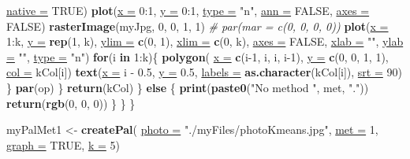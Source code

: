 \documentclass[twoside,symmetric]{book}
\newenvironment{Shaded}{}{}
\newcommand{\CommentTok}[1]{\textit{#1}}
\newcommand{\ControlFlowTok}[1]{\textbf{#1}}
\newcommand{\DataTypeTok}[1]{\underline{#1}}
\newcommand{\DecValTok}[1]{#1}
\newcommand{\FloatTok}[1]{#1}
\newcommand{\KeywordTok}[1]{\textbf{#1}}
\newcommand{\NormalTok}[1]{#1}
\newcommand{\OperatorTok}[1]{#1}
\newcommand{\OtherTok}[1]{#1}
\newcommand{\StringTok}[1]{#1}
\begin{document}
\begin{Shaded}
\begin{Highlighting}[]
                  \DataTypeTok{native =} \OtherTok{TRUE}\NormalTok{)}
                \KeywordTok{plot}\NormalTok{(}\DataTypeTok{x =} \DecValTok{0}\OperatorTok{:}\DecValTok{1}\NormalTok{, }\DataTypeTok{y =} \DecValTok{0}\OperatorTok{:}\DecValTok{1}\NormalTok{, }
                     \DataTypeTok{type =} \StringTok{"n"}\NormalTok{, }
                     \DataTypeTok{ann =} \OtherTok{FALSE}\NormalTok{, }
                     \DataTypeTok{axes =} \OtherTok{FALSE}\NormalTok{)}
                \KeywordTok{rasterImage}\NormalTok{(myJpg, }\DecValTok{0}\NormalTok{, }\DecValTok{0}\NormalTok{, }\DecValTok{1}\NormalTok{, }\DecValTok{1}\NormalTok{)}
                \CommentTok{# par(mar = c(0, 0, 0, 0))}
                \KeywordTok{plot}\NormalTok{(}\DataTypeTok{x =} \DecValTok{1}\OperatorTok{:}\NormalTok{k, }\DataTypeTok{y =} \KeywordTok{rep}\NormalTok{(}\DecValTok{1}\NormalTok{, k), }\DataTypeTok{ylim =} \KeywordTok{c}\NormalTok{(}\DecValTok{0}\NormalTok{, }\DecValTok{1}\NormalTok{), }
                    \DataTypeTok{xlim =} \KeywordTok{c}\NormalTok{(}\DecValTok{0}\NormalTok{, k), }\DataTypeTok{axes =} \OtherTok{FALSE}\NormalTok{, }\DataTypeTok{xlab =} \StringTok{""}\NormalTok{, }
                    \DataTypeTok{ylab =} \StringTok{""}\NormalTok{, }\DataTypeTok{type =} \StringTok{"n"}\NormalTok{)}
                \ControlFlowTok{for}\NormalTok{(i }\ControlFlowTok{in} \DecValTok{1}\OperatorTok{:}\NormalTok{k)\{}
                    \KeywordTok{polygon}\NormalTok{(}
                      \DataTypeTok{x =} \KeywordTok{c}\NormalTok{(i}\DecValTok{-1}\NormalTok{, i, i, i}\DecValTok{-1}\NormalTok{), }
                      \DataTypeTok{y =} \KeywordTok{c}\NormalTok{(}\DecValTok{0}\NormalTok{, }\DecValTok{0}\NormalTok{, }\DecValTok{1}\NormalTok{, }\DecValTok{1}\NormalTok{), }
                        \DataTypeTok{col =}\NormalTok{ kCol[i])}
                    \KeywordTok{text}\NormalTok{(}\DataTypeTok{x =}\NormalTok{ i }\OperatorTok{-}\StringTok{ }\FloatTok{0.5}\NormalTok{, }\DataTypeTok{y =} \FloatTok{0.5}\NormalTok{, }
                        \DataTypeTok{labels =} \KeywordTok{as.character}\NormalTok{(kCol[i]), }\DataTypeTok{srt =} \DecValTok{90}\NormalTok{)}
\NormalTok{                \}}
                \KeywordTok{par}\NormalTok{(op)}
\NormalTok{            \}}
            \KeywordTok{return}\NormalTok{(kCol)}
\NormalTok{        \} }\ControlFlowTok{else}\NormalTok{ \{}
            \KeywordTok{print}\NormalTok{(}\KeywordTok{paste0}\NormalTok{(}\StringTok{"No method "}\NormalTok{, met, }\StringTok{"."}\NormalTok{))}
            \KeywordTok{return}\NormalTok{(}\KeywordTok{rgb}\NormalTok{(}\DecValTok{0}\NormalTok{, }\DecValTok{0}\NormalTok{, }\DecValTok{0}\NormalTok{))}
\NormalTok{        \}}
\NormalTok{    \}}
\NormalTok{\}}

\NormalTok{myPalMet1 <-}\StringTok{ }\KeywordTok{createPal}\NormalTok{(}
  \DataTypeTok{photo =} \StringTok{"./myFiles/photoKmeans.jpg"}\NormalTok{, }
  \DataTypeTok{met =} \DecValTok{1}\NormalTok{, }
  \DataTypeTok{graph =} \OtherTok{TRUE}\NormalTok{, }
  \DataTypeTok{k =} \DecValTok{5}\NormalTok{)}
\end{Highlighting}
\end{Shaded}
\end{document}
